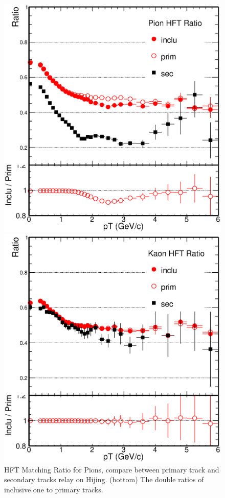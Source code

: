 \documentclass[a4paper]{article}
\begin{document}
\begin{figure}[htbp]
\begin{minipage}[htbp]{0.47\linewidth}
\centering
\includegraphics[width=1.0\textwidth,angle=0]{fig/Double_Ratio_Pion.eps}
\caption{ HFT Matching Ratio for Pions, compare between primary track and secondary tracks relay on Hijing. (bottom) The double ratios of inclusive one to primary tracks.\label{HijingPionsRatio}}
\end{minipage}
\hfill
\begin{minipage}[htbp]{0.47\linewidth}
\centering
\includegraphics[width=1.0\textwidth,angle=0]{fig/Double_Ratio_Kaon.eps} 

\end{minipage}
\end{figure}
\end{document}
